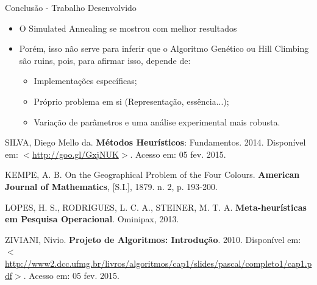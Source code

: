 \documentclass[compress, hide notes]{beamer}
\let\olditem=\item%
\renewcommand{\item}{\olditem \justifying}%
\begin{document}
	
	\begin{frame}{Conclusão - Trabalho Desenvolvido}
		
		\begin{itemize}
			
			\item O Simulated Annealing se mostrou com melhor resultados
            
            \bigskip
            
            \item Porém, isso não serve para inferir que o Algoritmo Genético ou Hill Climbing são ruins, pois, para afirmar isso, depende de:
            
            
            \begin{itemize}
				\item Implementações específicas;
                \bigskip
                \item Próprio problema em si (Representação, essência...);
                \bigskip
                \item Variação de parâmetros e uma análise experimental mais robusta.
			\end{itemize}
            
			
		\end{itemize}
		
	\end{frame}


\frame{\titlepage}



	
\begin{thebibliography}{99}
		
	SILVA, Diego Mello da. \textbf{Métodos Heurísticos}: Fundamentos. 2014. Disponível em: $<$\url{http://goo.gl/GxjNUK}$>$. Acesso em: 05 fev. 2015.
    
    KEMPE, A. B. On the Geographical Problem of the Four Colours. \textbf{American Journal of Mathematics}, [S.I.], 1879. n. 2, p. 193-200.
    
    LOPES, H. S., RODRIGUES, L. C. A., STEINER, M. T. A. \textbf{Meta-heurísticas em Pesquisa Operacional}. Ominipax, 2013.
	
	ZIVIANI, Nivio. \textbf{Projeto de Algoritmos: Introdução}. 2010. Disponível em: $<$\url{http://www2.dcc.ufmg.br/livros/algoritmos/cap1/slides/pascal/completo1/cap1.pdf}$>$. Acesso em: 05 fev. 2015.
	
\end{thebibliography}
\end{document}
